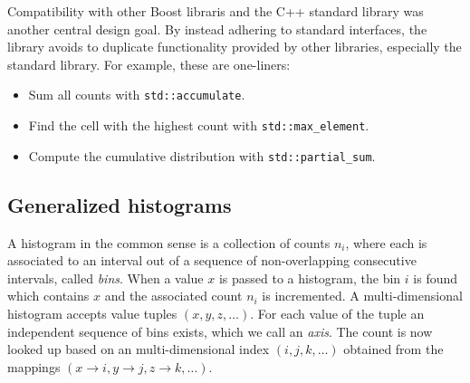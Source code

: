 \documentclass{webofc}
\begin{document}
Compatibility with other Boost libraris and the C++ standard library was another central design goal. By instead adhering to standard interfaces, the library avoids to duplicate functionality provided by other libraries, especially the standard library. For example, these are one-liners:
\begin{itemize}
\item Sum all counts with \verb|std::accumulate|.
\item Find the cell with the highest count with \verb|std::max_element|.
\item Compute the cumulative distribution with \verb|std::partial_sum|.
\end{itemize}

\subsection{Generalized histograms}
\label{sec-bh-cpp-gen}

A histogram in the common sense is a collection of counts $n_i$, where each is associated to an interval out of a sequence of non-overlapping consecutive intervals, called \emph{bins}. When a value $x$ is passed to a histogram, the bin $i$ is found which contains $x$ and the associated count $n_i$ is incremented. A multi-dimensional histogram accepts value tuples $(x, y, z, \dots)$. For each value of the tuple an independent sequence of bins exists, which we call an \emph{axis}. The count is now looked up based on an multi-dimensional index $(i,j,k,\dots)$ obtained from the mappings $(x \rightarrow i, y \rightarrow j, z \rightarrow k, \dots)$.
\end{document}
